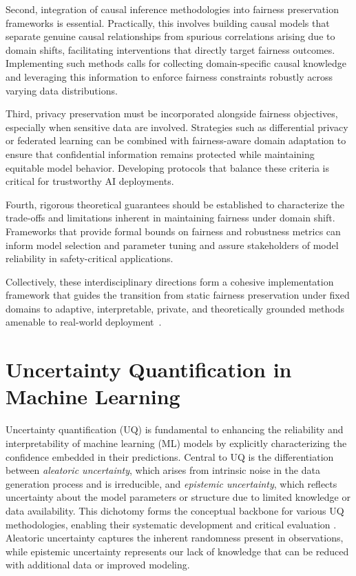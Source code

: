 \documentclass[sigconf]{acmart}
\begin{document}
Second, integration of causal inference methodologies into fairness preservation frameworks is essential. Practically, this involves building causal models that separate genuine causal relationships from spurious correlations arising due to domain shifts, facilitating interventions that directly target fairness outcomes. Implementing such methods calls for collecting domain-specific causal knowledge and leveraging this information to enforce fairness constraints robustly across varying data distributions.

Third, privacy preservation must be incorporated alongside fairness objectives, especially when sensitive data are involved. Strategies such as differential privacy or federated learning can be combined with fairness-aware domain adaptation to ensure that confidential information remains protected while maintaining equitable model behavior. Developing protocols that balance these criteria is critical for trustworthy AI deployments.

Fourth, rigorous theoretical guarantees should be established to characterize the trade-offs and limitations inherent in maintaining fairness under domain shift. Frameworks that provide formal bounds on fairness and robustness metrics can inform model selection and parameter tuning and assure stakeholders of model reliability in safety-critical applications.

Collectively, these interdisciplinary directions form a cohesive implementation framework that guides the transition from static fairness preservation under fixed domains to adaptive, interpretable, private, and theoretically grounded methods amenable to real-world deployment~\cite{ref26}.

\section{Uncertainty Quantification in Machine Learning}

Uncertainty quantification (UQ) is fundamental to enhancing the reliability and interpretability of machine learning (ML) models by explicitly characterizing the confidence embedded in their predictions. Central to UQ is the differentiation between \emph{aleatoric uncertainty}, which arises from intrinsic noise in the data generation process and is irreducible, and \emph{epistemic uncertainty}, which reflects uncertainty about the model parameters or structure due to limited knowledge or data availability. This dichotomy forms the conceptual backbone for various UQ methodologies, enabling their systematic development and critical evaluation \cite{ref28}. Aleatoric uncertainty captures the inherent randomness present in observations, while epistemic uncertainty represents our lack of knowledge that can be reduced with additional data or improved modeling.
\end{document}
